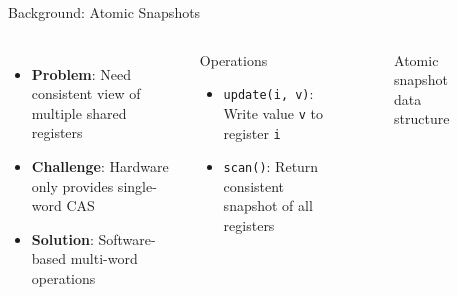 \documentclass[aspectratio=169]{beamer}
\begin{document}
\begin{frame}{Background: Atomic Snapshots}
    \begin{columns}[c]
        \begin{itemize}
            \item \textbf{Problem}: Need consistent view of multiple shared registers
            \item \textbf{Challenge}: Hardware only provides single-word CAS
            \item \textbf{Solution}: Software-based multi-word operations
        \end{itemize}

        \vspace{0.3cm}
        \begin{block}{Operations}
            \begin{itemize}
                \item \texttt{update(i, v)}: Write value \texttt{v} to register \texttt{i}
                \item \texttt{scan()}: Return consistent snapshot of all registers
            \end{itemize}
        \end{block}

        \begin{figure}
            \centering
            \caption{Atomic snapshot data structure}
        \end{figure}
    \end{columns}
\end{frame}
\end{document}
